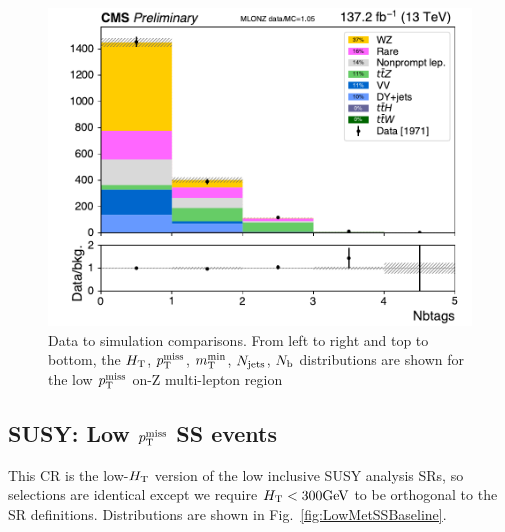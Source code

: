 \begin{figure}[!htb]
\includegraphics[width=0.45\linewidth]{figs/ssan/cr/run2_mlonz_nbtags_in.pdf}
\caption{ Data to simulation comparisons. From left to right  and top to bottom,
the $H_{\mathrm{T}}$, $p_{\mathrm{T}}^\text{miss}$, $m_{\mathrm{T}}^{\text{min}}$, $N_\text{jets}$, $N_\mathrm{b}$ distributions are
shown for the low $p_{\mathrm{T}}^\text{miss}$ on-Z multi-lepton region}
\label{fig:MLLowMetBaseline}
\end{figure}


\FloatBarrier

\subsection{SUSY: Low $p_{\mathrm{T}}^\text{miss}$ SS events}\label{LowMetSS}

This CR is the low-$H_{\mathrm{T}}$ version of the low \ptmiss inclusive SUSY analysis SRs, so selections
are identical except we require $H_{\mathrm{T}}<300 \text{GeV}$ to be orthogonal to the SR definitions.
Distributions are shown in Fig.~\ref{fig:LowMetSSBaseline}.

